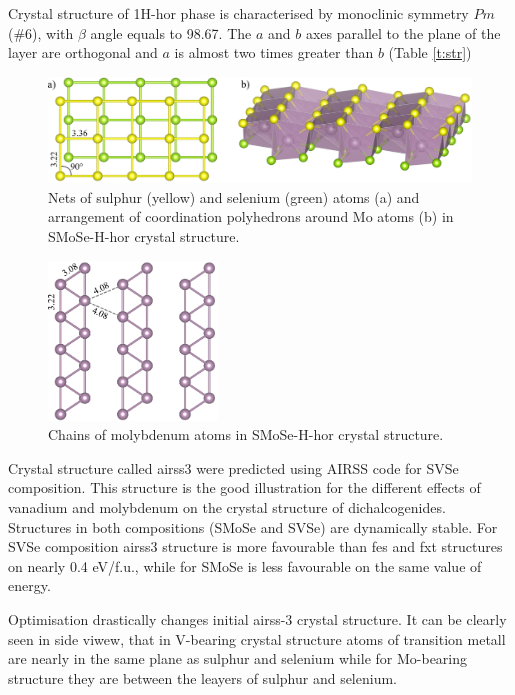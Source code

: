 \documentclass[a4paperm]{article}
\begin{document}
Crystal structure of 1H-hor phase is characterised by monoclinic symmetry $Pm$ (\#6), with $\beta$ angle equals to 98.67\textdegree.
The $a$ and $b$ axes parallel to the plane of the layer are orthogonal and $a$ is almost two times greater than $b$ (Table \ref{t:str})

\begin{figure}[H]
	\includegraphics[width=\textwidth]{H-hor.png}
	\caption{Nets of sulphur (yellow) and selenium (green) atoms (a) and arrangement of coordination polyhedrons around Mo atoms (b) in SMoSe-H-hor crystal structure.}
\label{H-hor}
\end{figure} 


\begin{figure}[H]
	\includegraphics[width=0.4\textwidth]{H-hor_Mo.png}
	\caption{Chains of molybdenum atoms in SMoSe-H-hor crystal structure.}
\label{H-hor_Mo}
\end{figure} 




Crystal structure called airss3 were predicted using AIRSS code for SVSe composition.
This structure is the good illustration for the different effects of vanadium and molybdenum on the crystal structure of dichalcogenides.
Structures in both compositions (SMoSe and SVSe) are dynamically stable.
For SVSe composition airss3 structure is more favourable than fes and fxt structures on nearly 0.4 eV/f.u., while for SMoSe is less favourable on the same value of energy.

Optimisation drastically changes initial airss-3 crystal structure.
It can be clearly seen in side viwew, that in V-bearing crystal structure atoms of transition metall are nearly in the same plane as sulphur and selenium while for Mo-bearing structure they are between the leayers of sulphur and selenium.
\end{document}
